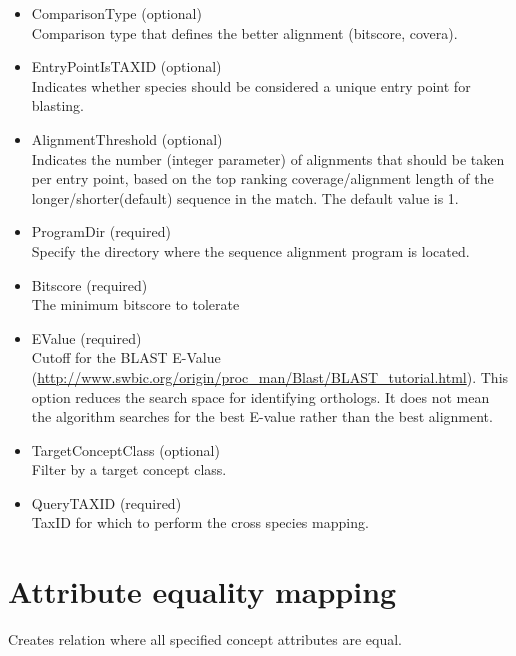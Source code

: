 \begin{itemize}
  \item{ComparisonType (optional)}\\	  
  Comparison type that defines the better alignment (bitscore, covera).
  
  \item{EntryPointIsTAXID (optional)}\\
  Indicates whether species should be considered a unique entry point for blasting.
  
  \item{AlignmentThreshold (optional)}\\
  Indicates the number (integer parameter) of alignments that should be taken per entry point, 
  based on the top ranking coverage/alignment length of the longer/shorter(default) sequence in the match.
  The default value is 1.
  
  \item{ProgramDir (required)}\\
  Specify the directory where the sequence alignment program is located.
  
  \item{Bitscore (required)}\\
  The minimum bitscore to tolerate
  
  \item{EValue (required)}\\
  Cutoff for the BLAST E-Value (\url{http://www.swbic.org/origin/proc_man/Blast/BLAST_tutorial.html}).
  This option reduces the search space for identifying orthologs.
  It does not mean the algorithm searches for the best E-value rather than the best alignment.
  
  \item{TargetConceptClass (optional)}\\
  Filter by a target concept class.
  
  \item{QueryTAXID (required)}\\
  TaxID for which to perform the cross species mapping.

\end{itemize}


\section{Attribute equality mapping}
Creates relation where all specified concept attributes are equal.

